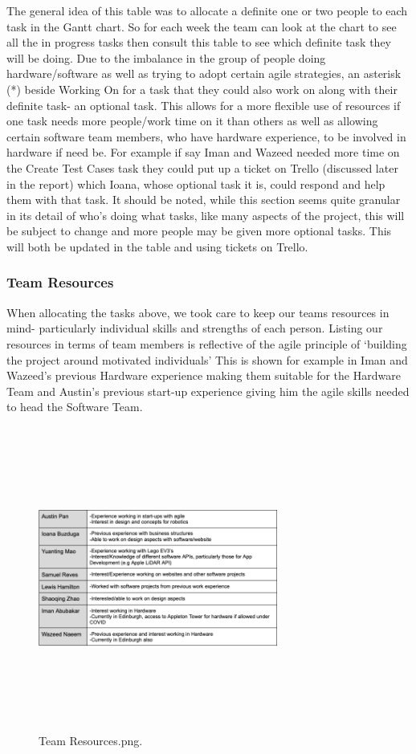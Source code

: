 \documentclass{article}
\begin{document}
The general idea of this table was to allocate a definite one or two people to each task in the Gantt chart. So for each week the team can look at the chart to see all the in progress tasks then consult this table to see which definite task they will be doing. 
\newline
Due to the imbalance in the group of people doing hardware/software as well as trying to adopt certain agile strategies, an asterisk (*) beside Working On for a task that they could also work on along with their definite task- an optional task. This allows for a more flexible use of resources if one task needs more people/work time on it than others as well as allowing certain software team members, who have hardware experience, to be involved in hardware if need be. For example if say Iman and Wazeed needed more time on the Create Test Cases task they could put up a ticket on Trello (discussed later in the report) which Ioana, whose optional task it is, could respond and help them with that task.  
\newline
It should be noted, while this section seems quite granular in its detail of who's doing what tasks, like many aspects of the project, this will be subject to change and more people may be given more optional tasks. This will both be updated in the table and using tickets on Trello. 
\subsubsection{Team Resources}
When allocating the tasks above, we took care to keep our teams resources in mind- particularly individual skills and strengths of each person. Listing our resources in terms of team members is reflective of the agile principle of ‘building the project around motivated individuals’ \cite{Agilemanifesto} This is shown for example in Iman and Wazeed’s previous Hardware experience making them suitable for the Hardware Team and Austin’s previous start-up experience giving him the agile skills needed to head the Software Team. 

\begin{figure}[h]
\begin{center}
  \includegraphics[width=0.7\textwidth,height=10cm]{Team Resources.png}
  \caption{Team Resources.png.}
  \end{center}
\end{figure}
\end{document}
